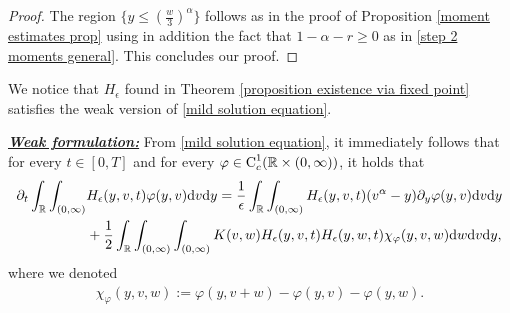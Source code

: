 \documentclass[11pt]{article}
\numberwithin{equation}{section}
\newcommand{\der}{\textup{d}}
\begin{document}
\begin{proof}
The region  $\{ y \leq (\frac{w}{3})^{\alpha}\}$ follows as in the proof of Proposition \ref{moment estimates prop} using in addition the fact that $1-\alpha-r\geq 0$ as in \eqref{step 2 moments general}. This concludes our proof.

\end{proof}
We notice that $H_{\epsilon}$ found in Theorem \ref{proposition existence via fixed point} satisfies the weak version of \eqref{mild solution equation}.

\vspace{0.2cm}

\noindent\underline{\textbf{\textit{Weak formulation:}}} From \eqref{mild solution equation}, it immediately follows that for every $t\in[0,T]$ and for every $\varphi\in\textup{C}^{1}_{c}(\mathbb{R}\times(0,\infty)) $, it holds that
\begin{align}
    \partial_{t}\int_{\mathbb{R}}\int_{(0,\infty)} &  H_{\epsilon}(y,v,t)\varphi(y,v)\der v \der y= \frac{1}{\epsilon}\int_{\mathbb{R}}\int_{(0,\infty)}H_{\epsilon}(y,v,t)(v^{\alpha}-y)\partial_{y}\varphi(y,v)\der v \der y\nonumber\\
    &+\frac{1}{2}\int_{\mathbb{R}}\int_{(0,\infty)} \int_{(0,\infty)} K(v,w)H_{\epsilon}(y,v,t)H_{\epsilon}(y,w,t)\chi_{\varphi}(y,v,w)\der w\der v \der y, \label{weak formulation}
\end{align}
where we denoted
\begin{align*}
    \chi_{\varphi}(y,v,w):=\varphi(y,v+w)-\varphi(y,v)-\varphi(y,w).
\end{align*}
\end{document}
